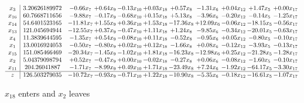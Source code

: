 \documentclass[9pt]{article}
\begin{document}
 \[\begin{array}{c| c c@{\hskip 2pt} c@{\hskip 2pt} c@{\hskip 2pt} c@{\hskip 2pt} c@{\hskip 2pt} c@{\hskip 2pt} c@{\hskip 2pt} c@{\hskip 2pt} c@{\hskip 2pt} }
 x_{3}   &  3.20626189972 & -0.66 x_{7} & +  0.64 x_{9} & -0.13 x_{10} & +  0.03 x_{18} & +  0.57 x_{8} & -1.31 x_{6} & +  0.04 x_{12} & +  1.47 x_{5} & +  0.00 x_{17}\\
 x_{16}   &  60.7668711656 & -9.88 x_{7} & -0.17 x_{9} & -0.68 x_{10} & +  0.15 x_{18} & +  5.13 x_{8} & -3.96 x_{6} & -0.20 x_{12} & -0.14 x_{5} & -1.25 x_{17}\\
 x_{14}   &  54.6401523165 & -11.81 x_{7} & +  1.55 x_{9} & +  0.36 x_{10} & +  1.53 x_{18} & -17.36 x_{8} & + 12.09 x_{6} & -0.06 x_{12} & -18.15 x_{5} & -0.56 x_{17}\\
 x_{13}   &  121.045694944 & -12.55 x_{7} & +  0.37 x_{9} & -0.47 x_{10} & +  1.11 x_{18} & +  1.24 x_{8} & -9.85 x_{6} & -0.34 x_{12} & -20.01 x_{5} & -0.63 x_{17}\\
 x_{4}   &  11.3839644595 & -1.35 x_{7} & +  0.54 x_{9} & -0.08 x_{10} & +  0.11 x_{18} & -0.52 x_{8} & -0.95 x_{6} & +  0.05 x_{12} & -0.80 x_{5} & -0.10 x_{17}\\
 x_{1}   &  13.0016924053 & -0.50 x_{7} & -0.80 x_{9} & +  0.02 x_{10} & +  0.12 x_{18} & -1.66 x_{8} & +  0.08 x_{6} & -0.12 x_{12} & -3.93 x_{5} & -0.13 x_{17}\\
 x_{15}   &  151.085466469 & -20.34 x_{7} & -1.45 x_{9} & -1.02 x_{10} & +  1.81 x_{18} & -16.23 x_{8} & -12.98 x_{6} & +  0.25 x_{12} & -21.28 x_{5} & -1.28 x_{17}\\
 x_{2}   &  5.04379098794 & +  0.52 x_{7} & -0.47 x_{9} & +  0.00 x_{10} & -0.02 x_{18} & -0.27 x_{8} & +  0.06 x_{6} & -0.08 x_{12} & -1.60 x_{5} & -0.10 x_{17}\\
 x_{11}   &  204.26041887 & -1.71 x_{7} & -8.99 x_{9} & +  0.49 x_{10} & +  1.71 x_{18} & -23.49 x_{8} & +  7.24 x_{6} & -1.92 x_{12} & -64.17 x_{5} & -3.30 x_{17}\\
\hline
z    &  126.503279035 & -10.72 x_{7} & -0.93 x_{9} & -0.71 x_{10} & +  1.22 x_{18} & -10.90 x_{8} & -5.35 x_{6} & -0.18 x_{12} & -16.61 x_{5} & -1.07 x_{17}\\
\end{array}\]


 $ x_{18} $ enters and $ x_{2} $ leaves 
\end{document}
